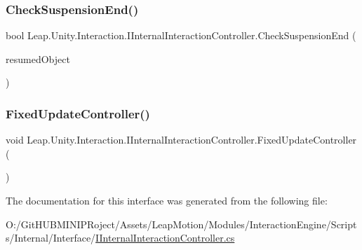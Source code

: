 \subsubsection{\texorpdfstring{CheckSuspensionEnd()}{CheckSuspensionEnd()}}
{\footnotesize\ttfamily bool Leap.\+Unity.\+Interaction.\+I\+Internal\+Interaction\+Controller.\+Check\+Suspension\+End (\begin{DoxyParamCaption}\item[{out \mbox{\hyperlink{interface_leap_1_1_unity_1_1_interaction_1_1_i_interaction_behaviour}{I\+Interaction\+Behaviour}}}]{resumed\+Object }\end{DoxyParamCaption})}

\mbox{\label{interface_leap_1_1_unity_1_1_interaction_1_1_i_internal_interaction_controller_a9977430f30f8238a45ea091ae1c91ede}} 
\subsubsection{\texorpdfstring{FixedUpdateController()}{FixedUpdateController()}}
{\footnotesize\ttfamily void Leap.\+Unity.\+Interaction.\+I\+Internal\+Interaction\+Controller.\+Fixed\+Update\+Controller (\begin{DoxyParamCaption}{ }\end{DoxyParamCaption})}



The documentation for this interface was generated from the following file\+:\begin{DoxyCompactItemize}
\item 
O\+:/\+Git\+H\+U\+B\+M\+I\+N\+I\+P\+Roject/\+Assets/\+Leap\+Motion/\+Modules/\+Interaction\+Engine/\+Scripts/\+Internal/\+Interface/\mbox{\hyperlink{_i_internal_interaction_controller_8cs}{I\+Internal\+Interaction\+Controller.\+cs}}\end{DoxyCompactItemize}
